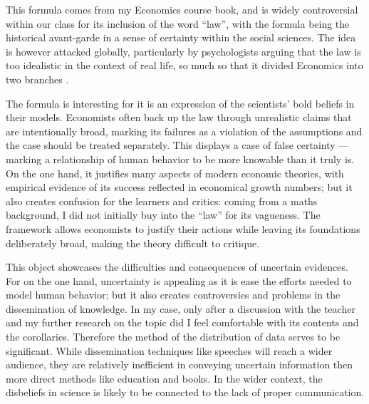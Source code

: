 \documentclass[a4paper,11pt]{article}
\begin{document}
This formula comes from my Economics course book, and is widely controversial within our class for its inclusion of the word ``law'', with the formula being the historical avant-garde in a sense of certainty within the social sciences. The idea is however attacked globally, particularly by psychologists arguing that the law is too idealistic in the context of real life, so much so that it divided Economics into two branches \parencite{DKahneman}.

The formula is interesting for it is an expression of the scientists' bold beliefs in their models. Economists often back up the law through unrealistic claims that are intentionally broad, marking its failures as a violation of the assumptions and the case should be treated separately. This displays a case of false certainty --- marking a relationship of human behavior to be more knowable than it truly is. On the one hand, it justifies many aspects of modern economic theories, with empirical evidence of its success reflected in economical growth numbers; but it also creates confusion for the learners and critics: coming from a maths background, I did not initially buy into the ``law'' for its vagueness. The framework allows economists to justify their actions while leaving its foundations deliberately broad, making the theory difficult to critique.

This object showcases the difficulties and consequences of uncertain evidences.  For on the one hand, uncertainty is appealing as it is ease the efforts needed to model human behavior; but it also creates controversies and problems in the dissemination of knowledge. In my case, only after a discussion with the teacher and my further research on the topic did I feel comfortable with its contents and the corollaries. Therefore the method of the distribution of data serves to be significant. While dissemination techniques like speeches will reach a wider audience, they are relatively inefficient in conveying  uncertain information then more direct methods like education and books. In the wider context, the disbeliefs in science is likely to be connected to the lack of proper communication.

\end{document}
